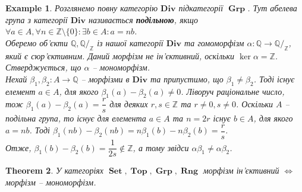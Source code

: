 \documentclass[a4paper, 10pt]{article}
\theoremstyle{theoremdd}
\newtheorem{theorem}{Theorem}[subsection]
\newtheorem{example}[theorem]{Example}
\DeclareMathOperator{\Set}{\textbf{Set}}
\DeclareMathOperator{\Grp}{\textbf{Grp}}
\DeclareMathOperator{\Rng}{\textbf{Rng}}
\DeclareMathOperator{\Top}{\textbf{Top}}
\begin{document}
\begin{example}
Розглянемо повну категорію $\textbf{Div}$ підкатегорії $\Grp$. Тут абелева група з категорії $\textbf{Div}$ називається \textbf{подільною}, якщо $\forall a \in A, \forall n \in \mathbb{Z} \setminus \{0\}: \exists b \in A: a = nb$.\\
Оберемо об'єкти $\mathbb{Q}, \mathbb{Q}/_{\mathbb{Z}}$ із нашої категорії $\textbf{Div}$ та гомоморфізм $\alpha \colon \mathbb{Q} \to \mathbb{Q}/_{\mathbb{Z}}$, який є сюр'єктивним. Даний морфізм не ін'єктивний, оскільки $\ker \alpha = \mathbb{Z}$. Стверджується, що $\alpha$ -- мономорфізм.\\
Нехай $\beta_1,\beta_2 \colon A \to \mathbb{Q}$ -- морфізми в $\textbf{Div}$ та припустимо, що $\beta_1 \neq \beta_2$. Тоді існує елемент $a \in A$, для якого $\beta_1(a) - \beta_2(a) \neq 0$. Ліворуч раціональне число, тож $\beta_1(a) - \beta_2(a) = \dfrac{r}{s}$ для деяких $r,s \in \mathbb{Z}$ та $r \neq 0, s \neq 0$. Оскільки $A$ -- подільна група, то існує для елемента $a \in A$ та $n = 2r$ існує $b \in A$, для якого $a = nb$. Тоді $\beta_1(nb) - \beta_2(nb) = n \beta_1(b) - n \beta_2(b) = \dfrac{r}{s}$.\\
Отже, $\beta_1(b) - \beta_2(b) = \dfrac{1}{2s} \notin \mathbb{Z}$, а тому звідси $\alpha \beta_1 \neq \alpha \beta_2$.
\end{example}

\begin{theorem}
У категоріях $\Set,\Top,\Grp,\Rng$ морфізм ін'єктивний $\iff$ морфізм -- мономорфізм.
\end{theorem}
\end{document}
